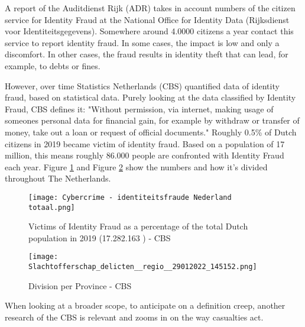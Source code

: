 A report of the Auditdienst Rijk (ADR)\cite{ADR} takes in account numbers of the citizen service for Identity Fraud at the National Office for Identity Data (Rijksdienst voor Identiteitsgegevens). Somewhere around 4.0000 citizens a year contact this service to report identity fraud. In some cases, the impact is low and only a discomfort. In other cases, the fraud results in identity theft that can lead, for example, to debts or fines.\par

However, over time Statistics Netherlands (CBS) quantified data of identity fraud, based on statistical data. Purely looking at the data classified by Identity Fraud, CBS defines it: "Without permission, via internet, making usage of someones personal data for financial gain, for example by withdraw or transfer of money, take out a loan or request of official documents." Roughly 0.5\% of Dutch citizens in 2019 became victim of identity fraud. Based on a population of 17 million, this means roughly 86.000 people are confronted with Identity Fraud each year. Figure \ref{fig:CBS_Total_ID_fraud} and Figure \ref{fig:CBS_ID_fraud} show the numbers and how it's divided throughout The Netherlands.

\graphicspath{ {./images/} }
\begin{figure}
\texttt{[image: Cybercrime - identiteitsfraude Nederland totaal.png]}\\
\caption{Victims of Identity Fraud \cite{CBS_IDFraudTable} as a percentage of the total Dutch population in 2019 (17.282.163 \cite{CBS_totalpopulation2019}) - CBS}  
\label{fig:CBS_Total_ID_fraud}
\end{figure}

\graphicspath{ {./images/} }
\begin{figure}
\texttt{[image: Slachtofferschap\_delicten\_\_regio\_\_29012022\_145152.png]}\\
\caption{Division per Province  \cite{CBS_IDFraudTable} - CBS}  
\label{fig:CBS_ID_fraud}
\end{figure}

When looking at a broader scope, to anticipate on a definition creep, another research of the CBS is relevant {\cite{CBS_casualtiesDigitalCrime}} and zooms in on the way casualties act.

